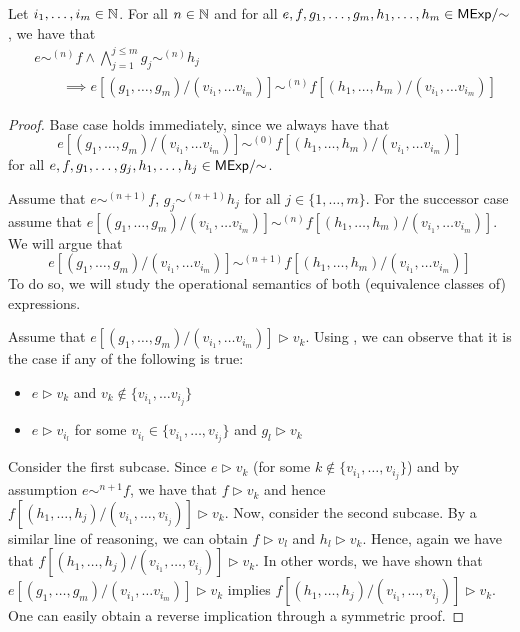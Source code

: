 \begin{lemma}\label{lem:subst-stratified-bisim}
	Let $i_1, \dots, i_m \in \mathbb{N}$. For all $n \in \mathbb{N}$ and for all $e,f,g_1, \dots, g_m, h_1, \dots, h_m \in {\mathsf{MExp}}/{\sim}$, we have that
	\begin{align*}
	&e \sim^{(n)} f \wedge \bigwedge_{j=1}^{j\leq m} g_j \sim^{(n)} h_j\\& \qquad \implies e[(g_1, \dots, g_m)/ (v_{i_1}, \dots v_{i_m})] \sim^{(n)}  f[(h_1, \dots, h_m)/ (v_{i_1}, \dots v_{i_m})] 
	\end{align*}  
\end{lemma}
\begin{proof}


	Base case holds immediately, since we always have that 
	$$e[(g_1, \dots, g_m)/ (v_{i_1}, \dots v_{i_m})] \sim^{(0)}  f[(h_1, \dots, h_m)/ (v_{i_1}, \dots v_{i_m})] 
$$ for all $e,f,g_1, \dots, g_j, h_1, \dots, h_j \in {\mathsf{MExp}}/{\sim}$.
	
	Assume that $e \sim^{(n + 1)} f$, $g_j \sim^{(n + 1)} h_j$ for all $j \in \{1, \dots, m\}$. For the successor case assume that $e[(g_1, \dots, g_m)/ (v_{i_1}, \dots v_{i_m})] \sim^{(n)} f[(h_1, \dots, h_m)/ (v_{i_1}, \dots v_{i_m})]$. We will argue that $$e[(g_1, \dots, g_m)/ (v_{i_1}, \dots v_{i_m})] \sim^{(n + 1)}  f[(h_1, \dots, h_m)/ (v_{i_1}, \dots v_{i_m})]$$ To do so, we will study the operational semantics of both (equivalence classes of) expressions. 
	
		Assume that $e[(g_1, \dots, g_m)/ (v_{i_1}, \dots v_{i_m})] \rhd v_k$. Using , we can observe that it is the case if any of the following is true: 
		\begin{itemize}
			\item $e \rhd v_k$ and $v_k \notin \{v_{i_1}, \dots v_{i_{j}}\}$ 
			\item $e \rhd v_{i_l}$ for some $v_{i_l} \in \{v_{i_1}, \dots, v_{i_j}\}$ and $g_l \rhd {v_k}$
		\end{itemize}
		Consider the first subcase. Since $e \rhd v_k$ (for some $k \notin \{v_{i_1}, \dots, v_{i_j}\}$) and by assumption $e \sim^{n+1} f$, we have that $f \rhd {v_k}$ and hence $f[(h_1, \dots, h_j)/(v_{i_1}, \dots, v_{i_j})] \rhd v_k$. Now, consider the second subcase. By a similar line of reasoning, we can obtain $f \rhd v_l$ and $h_l \rhd v_k$. Hence, again we have that $f[(h_1, \dots, h_j)/(v_{i_1}, \dots, v_{i_j})] \rhd v_k$. In other words, we have shown that $e[(g_1, \dots, g_m)/ (v_{i_1}, \dots v_{i_m})] \rhd v_k$ implies $f[(h_1, \dots, h_j)/(v_{i_1}, \dots, v_{i_j})] \rhd v_k$. One can easily obtain a reverse implication through a symmetric proof.
		

\end{proof}
